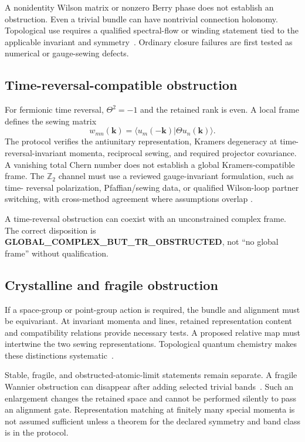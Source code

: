 \documentclass[11pt]{article}
\newenvironment{prospective}{\color{prospectivered}}{}
\begin{document}
\begin{prospective}
A nonidentity Wilson matrix or nonzero Berry phase does not establish an obstruction.
Even a trivial bundle can have nontrivial connection holonomy. Topological use requires
a qualified spectral-flow or winding statement tied to the applicable invariant and
symmetry~\cite{alexandradinata2014}. Ordinary closure failures are first tested as
numerical or gauge-sewing defects.

\subsection{Time-reversal-compatible obstruction}
For fermionic time reversal, $\Theta^2=-1$ and the retained rank is even. A local frame
defines the sewing matrix
\begin{equation}
 w_{mn}(\mathbf k)=\langle u_m(-\mathbf k)|\Theta u_n(\mathbf k)\rangle.
\end{equation}
The protocol verifies the antiunitary representation, Kramers degeneracy at time-
reversal-invariant momenta, reciprocal sewing, and required projector covariance. A
vanishing total Chern number does not establish a global Kramers-compatible frame. The
$\mathbb Z_2$ channel must use a reviewed gauge-invariant formulation, such as time-
reversal polarization, Pfaffian/sewing data, or qualified Wilson-loop partner switching,
with cross-method agreement where assumptions overlap
\cite{fukane2006,soluyanov2011,yu2011}.

A time-reversal obstruction can coexist with an unconstrained complex frame. The correct
disposition is \textbf{GLOBAL\_COMPLEX\_BUT\_TR\_OBSTRUCTED}, not ``no global frame''
without qualification.

\subsection{Crystalline and fragile obstruction}
If a space-group or point-group action is required, the bundle and alignment must be
equivariant. At invariant momenta and lines, retained representation content and
compatibility relations provide necessary tests. A proposed relative map must intertwine
the two sewing representations. Topological quantum chemistry makes these distinctions
systematic~\cite{bradlyn2017}.

Stable, fragile, and obstructed-atomic-limit statements remain separate. A fragile
Wannier obstruction can disappear after adding selected trivial bands~\cite{po2018}.
Such an enlargement changes the retained space and cannot be performed silently to pass
an alignment gate. Representation matching at finitely many special momenta is not
assumed sufficient unless a theorem for the declared symmetry and band class is in the
protocol.


\end{prospective}
\end{document}
